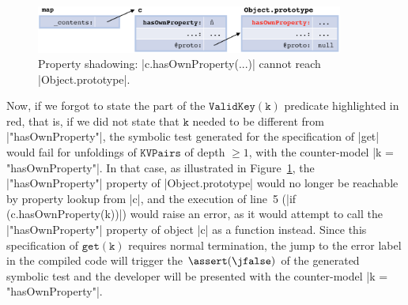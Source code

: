 \begin{figure}[t!]
\centering
\includegraphics[width=0.9\textwidth]{figures/heapfail.png}
\caption{Property shadowing: \jsinline|c.hasOwnProperty(...)| cannot reach \jsinline|Object.prototype|.} 
\label{fig:cexget}
\vspace{-0.5cm}
\end{figure}

Now, if we forgot to state the part of the $\mathtt{ValidKey(k)}$ predicate highlighted in red, that is, if we did not state that $\mathtt{k}$ needed to be different from \jsinline|"hasOwnProperty"|, the symbolic test generated for the specification of \jsinline|get| would fail for unfoldings of $\mathtt{KVPairs}$ of depth $\geq 1$, with the counter-model \jsinline|k = "hasOwnProperty"|. 
In that case, as illustrated in Figure~\ref{fig:cexget}, the \jsinline|"hasOwnProperty"| property of \jsinline|Object.prototype| would no longer be reachable by property lookup from \jsinline|c|, and
the execution of line~5 (\jsinline|if (c.hasOwnProperty(k))|) would raise an error, as it would attempt to call the \jsinline|"hasOwnProperty"| property of object \jsinline|c| as a function instead. 
Since this specification of $\mathtt{get(k)}$ requires normal termination, the jump to the error label in the compiled \jsil code will trigger the $\assert(\jfalse)$ of the generated symbolic test and the developer will be presented with the counter-model \jsinline|k = "hasOwnProperty"|.

\begin{center}
\end{center}


